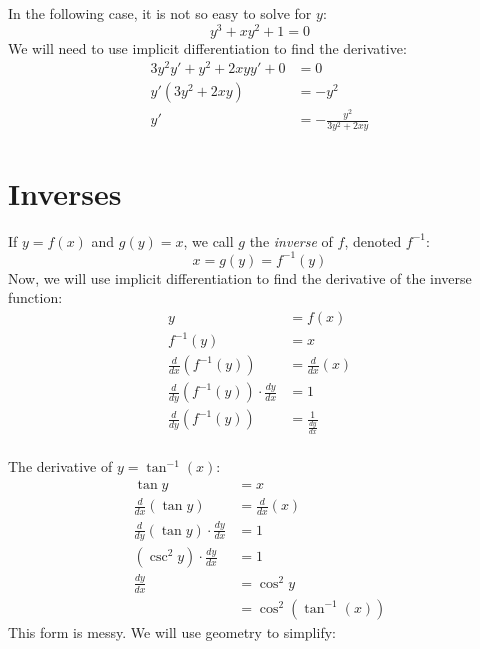 \documentclass[../main.tex]{subfiles}
\begin{document}
\begin{exmp}
    In the following case, it is not so easy to solve for $y$:
    \[ y^3 +xy^2 + 1 = 0 \]
    We will need to use implicit differentiation to find the derivative:
    \begin{align*}
        3y^2y' + y^2 + 2xyy' + 0 &= 0\\
        y' \left( 3y^2 + 2xy \right) &= -y^2\\
        y' &= - \frac{y^2}{3y^2 + 2xy}
    \end{align*}
\end{exmp}
\section{Inverses}
If $y = f(x)$ and $g(y) = x$, we call $g$ the \emph{inverse} of $f$, 
denoted $f^{-1}$:
\[ x = g(y) = f^{-1}(y) \]
Now, we will use implicit differentiation to find the derivative 
of the inverse function:
\begin{align*}
    y &= f(x)\\
    f^{-1}(y) &= x\\
    \frac{d}{dx} \left( f^{-1}(y) \right) &= \frac{d}{dx}(x)\\
    \frac{d}{dy} \left( f^{-1}(y) \right) \cdot \frac{dy}{dx} &= 1\\
    \frac{d}{dy} \left( f^{-1}(y) \right) &= \frac{1}{\frac{dy}{dx}}\\
\end{align*}
\begin{exmp}
    The derivative of $y = \tan^{-1}(x)$:
    \begin{align*}
        \tan y &= x\\
        \frac{d}{dx} \left( \tan y \right) &= \frac{d}{dx}(x)\\
        \frac{d}{dy} \left( \tan y \right) \cdot \frac{dy}{dx} &= 1\\
        \left( \csc^2 y \right) \cdot \frac{dy}{dx} &= 1\\
        \frac{dy}{dx} &= \cos^2 y\\
        &= \cos^2 \left( \tan^{-1}(x) \right)
    \end{align*}
    This form is messy. We will use geometry to simplify:
\end{exmp}
\end{document}
